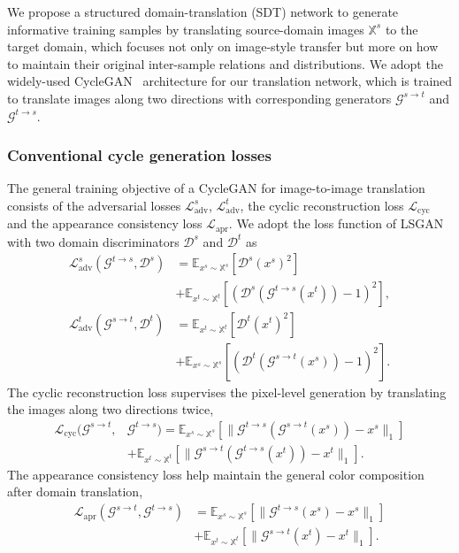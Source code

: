 \documentclass[journal]{IEEEtran}
\def\sX{{\mathbb{X}}}
\begin{document}
We propose a structured domain-translation (SDT) network to generate informative training samples by translating source-domain images $\sX^s$ to the target domain, which focuses not only on image-style transfer but more on how to maintain their original inter-sample relations and distributions.
We adopt the widely-used CycleGAN~\cite{zhu2017unpaired} architecture for our translation network, which is trained to translate images along two directions
with corresponding generators $\mathcal{G}^{s\to t}$ and $\mathcal{G}^{t\to s}$.

\subsubsection{\textbf{Conventional cycle generation losses}}
The general training objective of a CycleGAN \cite{zhu2017unpaired} for image-to-image translation consists of the adversarial losses $\mathcal{L}_\text{adv}^s$, $\mathcal{L}_\text{adv}^t$, the cyclic reconstruction loss $\mathcal{L}_\text{cyc}$ and the appearance consistency loss $\mathcal{L}_\text{apr}$. We adopt the loss function of LSGAN \cite{mao2017least} with two domain discriminators $\mathcal{D}^s$ and $\mathcal{D}^t$ as
{
\begin{align}
\mathcal{L}_\text{adv}^s(\mathcal{G}^{t\to s},\mathcal{D}^s)&=\mathbb{E}_{x^s\sim \sX^s}\left[\mathcal{D}^s(x^s)^2 \right] \nonumber \\
&+\mathbb{E}_{x^t\sim \sX^t}\left[\left(\mathcal{D}^s(\mathcal{G}^{t\to s}(x^t))-1 \right)^2 \right],
\nonumber \\
\mathcal{L}_\text{adv}^t(\mathcal{G}^{s\to t},\mathcal{D}^t)&=\mathbb{E}_{x^t\sim \sX^t}\left[\mathcal{D}^t(x^t)^2 \right] \nonumber \\
&+\mathbb{E}_{x^s\sim \sX^s}\left[\left(\mathcal{D}^t(\mathcal{G}^{s\to t}(x^s))-1 \right)^2 \right].
\end{align}}The cyclic reconstruction loss supervises the pixel-level generation by translating the images along two directions twice,
{
\begin{align}
\mathcal{L}_\text{cyc}(\mathcal{G}^{s\to t}, &\mathcal{G}^{t\to s}) = \mathbb{E}_{x^s\sim \sX^s}\left[\| \mathcal{G}^{t\to s}(\mathcal{G}^{s\to t}(x^s)) - x^s \|_1 \right] \nonumber \\
&+\mathbb{E}_{x^t\sim \sX^t}\left[\| \mathcal{G}^{s\to t}(\mathcal{G}^{t\to s}(x^t)) - x^t \|_1 \right] .
\end{align}}The appearance consistency loss \cite{taigman2017unsupervised} help maintain the general color composition after domain translation,
{
\begin{align}
\mathcal{L}_\text{apr}(\mathcal{G}^{s\to t}, \mathcal{G}^{t\to s})&=\mathbb{E}_{x^s\sim \sX^s}\left[\| \mathcal{G}^{t\to s}(x^s) - x^s \|_1 \right] \nonumber \\
&+
\mathbb{E}_{x^t\sim \sX^t}\left[\| \mathcal{G}^{s\to t}(x^t) - x^t \|_1 \right].
\end{align}}
\end{document}
